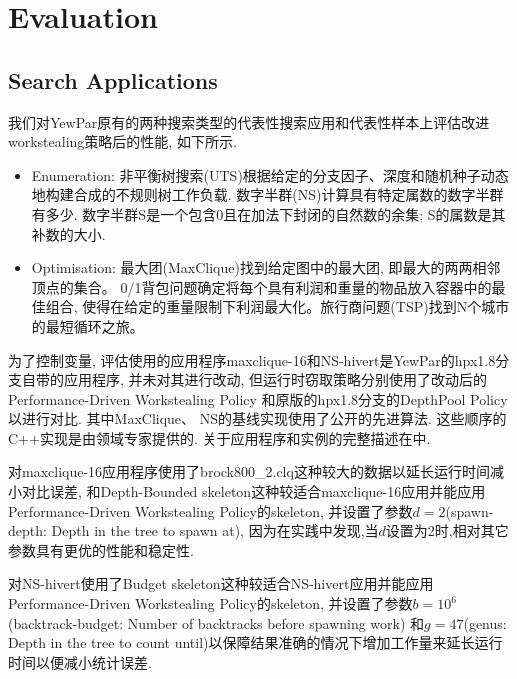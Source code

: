 \documentclass{mproj}
\begin{document}
\chapter{Evaluation}

\section{Search Applications}

我们对YewPar原有的两种搜索类型的代表性搜索应用和代表性样本上评估改进workstealing策略后的性能,
如下所示.

\begin{itemize}
    \item Enumeration:
          非平衡树搜索(UTS)根据给定的分支因子、深度和随机种子动态地构建合成的不规则树工作负载\cite{olivier2006uts}.
          数字半群(NS)计算具有特定属数的数字半群有多少\cite{fromentin2016exploring}.
          数字半群S是一个包含0且在加法下封闭的自然数的余集;
          S的属数是其补数的大小.
    \item Optimisation:
          最大团(MaxClique)找到给定图中的最大团,
          即最大的两两相邻顶点的集合。
          0/1背包问题确定将每个具有利润和重量的物品放入容器中的最佳组合,
          使得在给定的重量限制下利润最大化。旅行商问题(TSP)找到N个城市的最短循环之旅。
\end{itemize}

为了控制变量,
评估使用的应用程序maxclique-16和NS-hivert是YewPar的hpx1.8分支自带的应用程序,
并未对其进行改动,
但运行时窃取策略分别使用了改动后的Performance-Driven Workstealing Policy
和原版的hpx1.8分支的DepthPool Policy以进行对比.
其中MaxClique\cite{mccreesh2013multithreading}、
NS\cite{fromentin2016exploring}的基线实现使用了公开的先进算法.
这些顺序的C++实现是由领域专家提供的.
关于应用程序和实例的完整描述在\cite{archibald2018}中.

对maxclique-16应用程序使用了brock800\_2.clq这种较大的数据以延长运行时间减小对比误差,
和Depth-Bounded skeleton这种较适合maxclique-16应用并能应用Performance-Driven Workstealing Policy的skeleton,
并设置了参数$d = 2$(spawn-depth: Depth in the tree to spawn at),
因为在实践中发现,当$d$设置为2时,相对其它参数具有更优的性能和稳定性.

对NS-hivert使用了Budget skeleton这种较适合NS-hivert应用并能应用Performance-Driven Workstealing Policy的skeleton,
并设置了参数$b = 10^6$(backtrack-budget: Number of backtracks before spawning work)
和$g = 47$(genus: Depth in the tree to count until)以保障结果准确的情况下增加工作量来延长运行时间以便减小统计误差.
\end{document}
